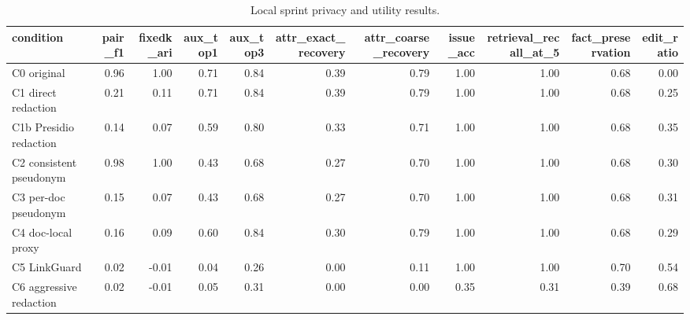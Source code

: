 \begin{table}[t]
\centering
\scriptsize
\setlength{\tabcolsep}{3pt}
\caption{Local sprint privacy and utility results.}
\label{tab:main_privacy_utility}
\begin{tabular}{lrrrrrrrrrr}
\toprule
condition & pair\_f1 & fixedk\_ari & aux\_top1 & aux\_top3 & attr\_exact\_recovery & attr\_coarse\_recovery & issue\_acc & retrieval\_recall\_at\_5 & fact\_preservation & edit\_ratio \\
\midrule
C0 original & 0.96 & 1.00 & 0.71 & 0.84 & 0.39 & 0.79 & 1.00 & 1.00 & 0.68 & 0.00 \\
C1 direct redaction & 0.21 & 0.11 & 0.71 & 0.84 & 0.39 & 0.79 & 1.00 & 1.00 & 0.68 & 0.25 \\
C1b Presidio redaction & 0.14 & 0.07 & 0.59 & 0.80 & 0.33 & 0.71 & 1.00 & 1.00 & 0.68 & 0.35 \\
C2 consistent pseudonym & 0.98 & 1.00 & 0.43 & 0.68 & 0.27 & 0.70 & 1.00 & 1.00 & 0.68 & 0.30 \\
C3 per-doc pseudonym & 0.15 & 0.07 & 0.43 & 0.68 & 0.27 & 0.70 & 1.00 & 1.00 & 0.68 & 0.31 \\
C4 doc-local proxy & 0.16 & 0.09 & 0.60 & 0.84 & 0.30 & 0.79 & 1.00 & 1.00 & 0.68 & 0.29 \\
C5 LinkGuard & 0.02 & -0.01 & 0.04 & 0.26 & 0.00 & 0.11 & 1.00 & 1.00 & 0.70 & 0.54 \\
C6 aggressive redaction & 0.02 & -0.01 & 0.05 & 0.31 & 0.00 & 0.00 & 0.35 & 0.31 & 0.39 & 0.68 \\
\bottomrule
\end{tabular}
\end{table}
